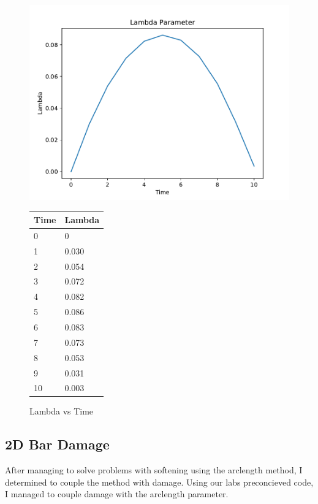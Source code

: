 \documentclass[10pt,a4paper]{article}
\begin{document}
	\begin{figure}[h!]
		\centering
		\begin{minipage}[t]{.58\textwidth}
			\centering
			\vspace{0pt}
			\includegraphics[width=\textwidth]{lambda_CL.pdf}
			\caption{Lambda vs Time}
		\end{minipage}\hfill
		\begin{minipage}[t]{.4\textwidth}
			\centering
			\vspace{0pt}
				\begin{tabular}{ll}
				\hline
				Time & Lambda \\ \hline
				0    & 0      \\
				1    & 0.030  \\
				2    & 0.054  \\ 
				3    & 0.072  \\
				4    & 0.082  \\
				5    & 0.086  \\
				6    & 0.083  \\
				7    & 0.073  \\
				8    & 0.053  \\
				9    & 0.031  \\
				10   & 0.003 
			\end{tabular}
		\end{minipage}
	\end{figure}
	\subsection{2D Bar Damage}
	After managing to solve problems with softening using the arclength method, I determined to couple the method with damage. Using our labs preconcieved code, I managed to couple damage with the arclength parameter. 
\end{document}
